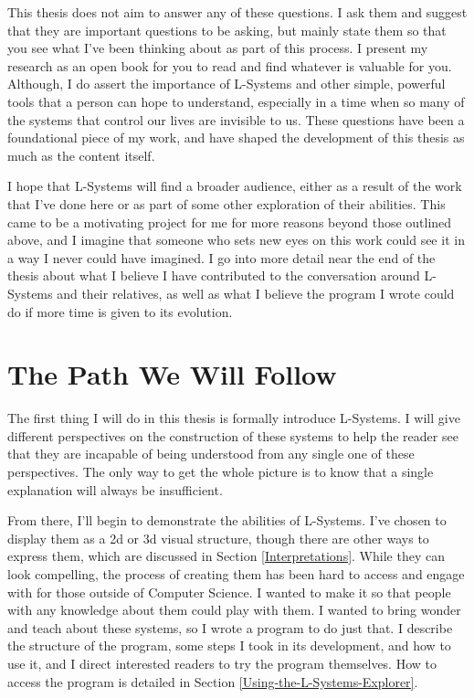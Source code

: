 \documentclass[12pt,twoside]{reedthesis}
\begin{document}
	This thesis does not aim to answer any of these questions. I ask them and suggest that they are important questions to be asking, but mainly state them so that you see what I've been thinking about as part of this process. I present my research as an open book for you to read and find whatever is valuable for you. Although, I do assert the importance of L-Systems and other simple, powerful tools that a person can hope to understand, especially in a time when so many of the systems that control our lives are invisible to us. These questions have been a foundational piece of my work, and have shaped the development of this thesis as much as the content itself.
	
	I hope that L-Systems will find a broader audience, either as a result of the work that I’ve done here or as part of some other exploration of their abilities. This came to be a motivating project for me for more reasons beyond those outlined above, and I imagine that someone who sets new eyes on this work could see it in a way I never could have imagined. I go into more detail near the end of the thesis about what I believe I have contributed to the conversation around L-Systems and their relatives, as well as what I believe the program I wrote could do if more time is given to its evolution.
	
	

	
\section*{The Path We Will Follow}

	The first thing I will do in this thesis is formally introduce L-Systems. I will give different perspectives on the construction of these systems to help the reader see that they are incapable of being understood from any single one of these perspectives. The only way to get the whole picture is to know that a single explanation will always be insufficient.

	From there, I'll begin to demonstrate the abilities of L-Systems. I've chosen to display them as a 2d or 3d visual structure, though there are other ways to express them, which are discussed in Section \ref{Interpretations}. While they can look compelling, the process of creating them has been hard to access and engage with for those outside of Computer Science. I wanted to make it so that people with any knowledge about them could play with them. I wanted to bring wonder and teach about these systems, so I wrote a program to do just that. I describe the structure of the program, some steps I took in its development, and how to use it, and I direct interested readers to try the program themselves. How to access the program is detailed in Section \ref{Using-the-L-Systems-Explorer}.%
	
\end{document}
